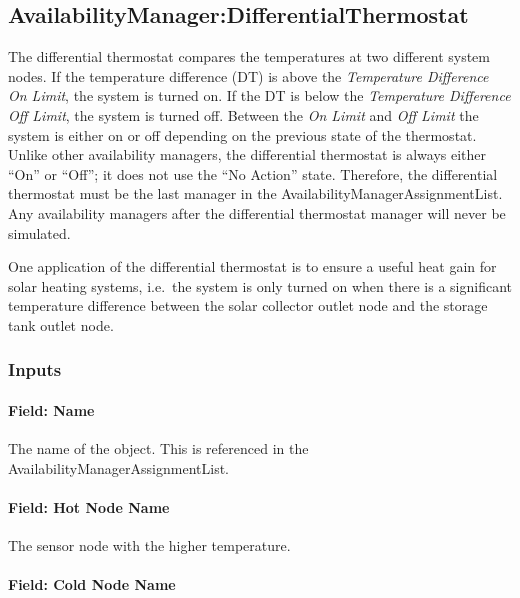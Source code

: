 \subsection{AvailabilityManager:DifferentialThermostat}\label{availabilitymanagerdifferentialthermostat}

The differential thermostat compares the temperatures at two different system nodes. If the temperature difference (DT) is above the \emph{Temperature Difference On Limit}, the system is turned on. If the DT is below the \emph{Temperature Difference Off Limit}, the system is turned off. Between the \emph{On Limit} and \emph{Off Limit} the system is either on or off depending on the previous state of the thermostat. Unlike other availability managers, the differential thermostat is always either ``On'' or ``Off''; it does not use the ``No Action'' state. Therefore, the differential thermostat must be the last manager in the AvailabilityManagerAssignmentList. Any availability managers after the differential thermostat manager will never be simulated.

One application of the differential thermostat is to ensure a useful heat gain for solar heating systems, i.e.~the system is only turned on when there is a significant temperature difference between the solar collector outlet node and the storage tank outlet node.

\subsubsection{Inputs}\label{inputs-4-034}

\paragraph{Field: Name}\label{field-name-3-032}

The name of the object. This is referenced in the AvailabilityManagerAssignmentList.

\paragraph{Field: Hot Node Name}\label{field-hot-node-name}

The sensor node with the higher temperature.

\paragraph{Field: Cold Node Name}\label{field-cold-node-name}


